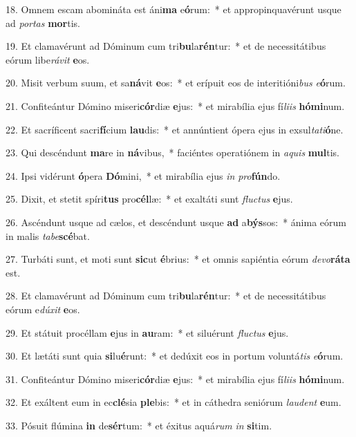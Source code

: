 18. Omnem escam abomináta est áni\textbf{ma} e\textbf{ó}rum:~*  et appropinquavérunt usque ad \textit{por}\textit{tas} \textbf{mor}tis.\

19. Et clamavérunt ad Dóminum cum tri\textbf{bu}la\textbf{rén}tur:~*  et de necessitátibus eórum libe\textit{rá}\textit{vit} \textbf{e}os.\

20. Misit verbum suum, et sa\textbf{ná}vit \textbf{e}os:~*  et erípuit eos de interitióni\textit{bus} \textit{e}\textbf{ó}rum.\

21. Confiteántur Dómino miseri\textbf{cór}diæ \textbf{e}jus:~*  et mirabília ejus fí\textit{li}\textit{is} \textbf{hó}\textbf{mi}num.\

22. Et sacríficent sacri\textbf{fí}cium \textbf{lau}dis:~*  et annúntient ópera ejus in exsul\textit{ta}\textit{ti}\textbf{ó}ne.\

23. Qui descéndunt \textbf{ma}re in \textbf{ná}vibus,~*  faciéntes operatiónem in \textit{a}\textit{quis} \textbf{mul}tis.\

24. Ipsi vidérunt \textbf{ó}pera \textbf{Dó}mini,~*  et mirabília ejus \textit{in} \textit{pro}\textbf{fún}do.\

25. Dixit, et stetit spíri\textbf{tus} pro\textbf{cél}læ:~*  et exaltáti sunt \textit{fluc}\textit{tus} \textbf{e}jus.\

26. Ascéndunt usque ad cælos, et descéndunt usque \textbf{ad} a\textbf{býs}sos:~*  ánima eórum in malis \textit{ta}\textit{be}\textbf{scé}bat.\

27. Turbáti sunt, et moti sunt \textbf{sic}ut \textbf{é}brius:~*  et omnis sapiéntia eórum \textit{de}\textit{vo}\textbf{rá}\textbf{ta} est.\

28. Et clamavérunt ad Dóminum cum tri\textbf{bu}la\textbf{rén}tur:~*  et de necessitátibus eórum e\textit{dú}\textit{xit} \textbf{e}os.\

29. Et státuit procéllam \textbf{e}jus in \textbf{au}ram:~*  et siluérunt \textit{fluc}\textit{tus} \textbf{e}jus.\

30. Et lætáti sunt quia \textbf{si}lu\textbf{é}runt:~*  et dedúxit eos in portum voluntá\textit{tis} \textit{e}\textbf{ó}rum.\

31. Confiteántur Dómino miseri\textbf{cór}diæ \textbf{e}jus:~*  et mirabília ejus fí\textit{li}\textit{is} \textbf{hó}\textbf{mi}num.\

32. Et exáltent eum in ec\textbf{clé}sia \textbf{ple}bis:~*  et in cáthedra seniórum \textit{lau}\textit{dent} \textbf{e}um.\

33. Pósuit flúmina \textbf{in} de\textbf{sér}tum:~*  et éxitus aquá\textit{rum} \textit{in} \textbf{si}tim.\

